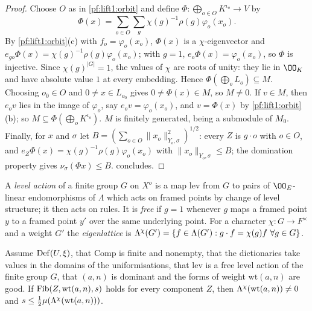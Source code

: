 \begin{proof}
Choose $O$ as in \cref{pf:lift1:orbit} and define $\Phi\colon\bigoplus_{o\in O}K^{\iota_o}\to V$ by
\[
\Phi(x)=\sum_{o\in O}\sum_g\chi(g)^{-1}\rho(g)\varphi_o(x_o).
\]
By \cref{pf:lift1:orbit}(c) with $f_o=\varphi_o(x_o)$, $\Phi(x)$ is a $\chi$-eigenvector and
$e_{go}\Phi(x)=\chi(g)^{-1}\rho(g)\varphi_o(x_o)$; with $g=1$, $e_o\Phi(x)=\varphi_o(x_o)$, so $\Phi$ is
injective. Since $\chi(g)^{|G|}=1$, the values of $\chi$ are roots of unity: they lie in $\OO_K$ and
have absolute value $1$ at every embedding. Hence $\Phi(\bigoplus_oL_o)\subseteq M$. Choosing
$o_0\in O$ and $0\ne x\in L_{o_0}$ gives $0\ne\Phi(x)\in M$, so $M\ne0$. If $v\in M$, then $e_ov$ lies in
the image of $\varphi_o$, say $e_ov=\varphi_o(x_o)$, and $v=\Phi(x)$ by \cref{pf:lift1:orbit}(b); so
$M\subseteq\Phi(\bigoplus_oK^{\iota_o})$. $M$ is finitely generated, being a submodule of $M_0$. Finally,
for $x$ and $\sigma$ let $B=(\sum_{o\in O}\|x_o\|^2_{Y_o,\sigma})^{1/2}$: every $Z$ is $g\cdot o$ with
$o\in O$, and $e_Z\Phi(x)=\chi(g)^{-1}\rho(g)\varphi_o(x_o)$ with $\|x_o\|_{Y_o,\sigma}\le B$; the domination
property gives $\nu_\sigma(\Phi x)\le B$.  concludes.
\end{proof}

A \emph{level action} of a finite group $G$ on $X^o$ is a map $\mathrm{lev}$ from $G$ to pairs of
$\OO_E$-linear endomorphisms of $\Lambda$ which acts on framed points by change of level structure;
it then acts on rules. It is \emph{free} if $g=1$ whenever $g$ maps a framed point $y$ to a framed
point $y'$ over the same underlying point. For a character $\chi\colon G\to F^\times$ and a weight $G'$
the \emph{eigenlattice} is
$\Lambda^{\chi}(G')=\{f\in\Lambda(G'):g\cdot f=\chi(g)f\ \forall g\in G\}$.

\begin{proposition}\label{pf:lift1:eiglat}
Assume $\mathrm{Def}(U,\xi)$, that $\mathrm{Comp}$ is finite and nonempty, that the dictionaries
take values in the domains of the uniformisations, that $\mathrm{lev}$ is a free level action of the
finite group $G$, that $(a,n)$ is dominant and the forms of weight $\mathrm{wt}(a,n)$ are good. If
$\mathrm{Fib}(Z,\mathrm{wt}(a,n),s)$ holds for every component $Z$, then
$\Lambda^{\chi}(\mathrm{wt}(a,n))\ne0$ and $s\le\frac12\mu(\Lambda^{\chi}(\mathrm{wt}(a,n)))$.
\end{proposition}

